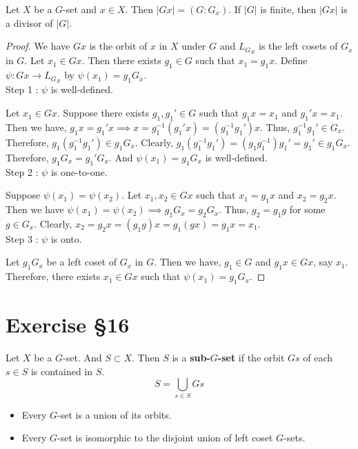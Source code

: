 \begin{theorem}
	Let $X$ be a $G$-set and $x \in X$.
	Then $|Gx| = (G:G_x)$.
	If $|G|$ is finite, then $|Gx|$ is a divisor of $|G|$.
\end{theorem}
\begin{proof}
	We have $Gx$ is the orbit of $x$ in $X$ under $G$ and ${L_G}_x$ is the left cosets of $G_x$ in $G$.
	Let $x_1 \in Gx$.
	Then there exists $g_1 \in G$ such that $x_1 = g_1x$.
	Define $\psi : Gx \to {L_G}_x$ by $\psi(x_1) = g_1G_x$.\\
	Step 1 : $\psi$ is well-defined.

	Let $x_1 \in Gx$. Suppose there exists $g_1,g_1' \in G$ such that $g_1x = x_1$ and $g_1'x = x_1$.
	Then we have, $g_1x = g_1'x \implies x = g_1^{-1}(g_1'x) = (g_1^{-1}g_1')x$.
	Thus, $g_1^{-1}g_1' \in G_x$.
	Therefore, $g_1(g_1^{-1}g_1') \in g_1G_x$.
	Clearly, $g_1(g_1^{-1}g_1') = (g_1g_1^{-1})g_1' = g_1' \in g_1G_x$.
	Therefore, $g_1G_x = g_1'G_x$.
	And $\psi(x_1) = g_1G_x$ is well-defined.\\
	Step 2 : $\psi$ is one-to-one.

	Suppose $\psi(x_1) = \psi(x_2)$.
	Let $x_1, x_2 \in Gx$ such that $x_1 = g_1x$ and $x_2 = g_2x$.
	Then we have $\psi(x_1) = \psi(x_2) \implies g_1G_x = g_2G_x$.
	Thus, $g_2 = g_1g$ for some $g \in G_x$.
	Clearly, $x_2 = g_2x = (g_1g)x = g_1(gx) = g_1x = x_1$.	\\
	Step 3 : $\psi$ is onto.

	Let $g_1G_x$ be a left coset of $G_x$ in $G$.
	Then we have, $g_1 \in G$ and $g_1x \in Gx$, say $x_1$.
	Therefore, there exists $x_1 \in Gx$ such that $\psi(x_1) = g_1G_x$.
\end{proof}


\section{Exercise \S16}
\begin{definition}
	Let $X$ be a $G$-set. And $S \subset X$. Then $S$ is a \textbf{sub-$G$-set} if the orbit $Gs$ of each $s \in S$ is contained in $S$.
	\begin{equation}
		S = \bigcup_{s \in S} Gs
	\end{equation}
\end{definition}

\begin{remark}
\begin{itemize}
	\item Every $G$-set is a union of its orbits.
	\item Every $G$-set is isomorphic to the disjoint union of left coset $G$-sets.
\end{itemize}
\end{remark}

